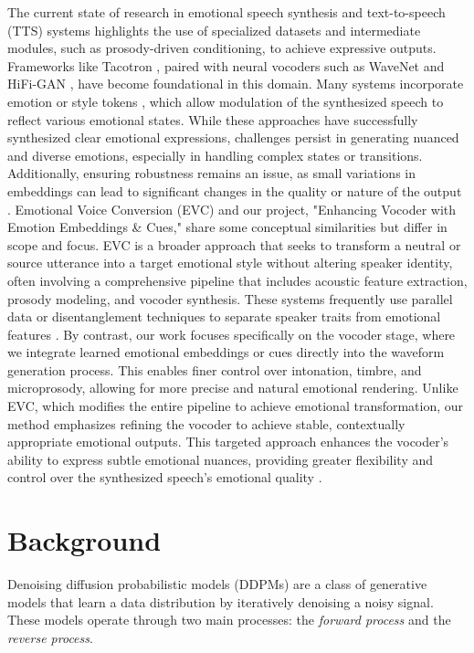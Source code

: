 \documentclass[12pt,a4paper]{article}
\begin{document}
The current state of research in emotional speech synthesis and text-to-speech
(TTS) systems highlights the use of specialized datasets and intermediate
modules, such as prosody-driven conditioning, to achieve expressive outputs.
Frameworks like Tacotron \cite{wang2017tacotron}, paired with neural vocoders
such as WaveNet \cite{oord2016wavenet} and HiFi-GAN \cite{kong2020hifi}, have
become foundational in this domain. Many systems incorporate emotion or style
tokens \cite{wang2018style}, which allow modulation of the synthesized speech to
reflect various emotional states. While these approaches have successfully
synthesized clear emotional expressions, challenges persist in generating
nuanced and diverse emotions, especially in handling complex states or
transitions. Additionally, ensuring robustness remains an issue, as small
variations in embeddings can lead to significant changes in the quality or
nature of the output \cite{zhang2021deep}. Emotional Voice Conversion (EVC) and
our project, "Enhancing Vocoder with Emotion Embeddings \& Cues," share some
conceptual similarities but differ in scope and focus. EVC is a broader approach
that seeks to transform a neutral or source utterance into a target emotional
style without altering speaker identity, often involving a comprehensive
pipeline that includes acoustic feature extraction, prosody modeling, and
vocoder synthesis. These systems frequently use parallel data or disentanglement
techniques to separate speaker traits from emotional features
\cite{zhou2020transforming}. By contrast, our work focuses specifically on the
vocoder stage, where we integrate learned emotional embeddings or cues directly
into the waveform generation process. This enables finer control over
intonation, timbre, and microprosody, allowing for more precise and natural
emotional rendering. Unlike EVC, which modifies the entire pipeline to achieve
emotional transformation, our method emphasizes refining the vocoder to achieve
stable, contextually appropriate emotional outputs. This targeted approach
enhances the vocoder’s ability to express subtle emotional nuances, providing
greater flexibility and control over the synthesized speech’s emotional quality
\cite{kim2021conditional}.

\newpage
\section{Background}

Denoising diffusion probabilistic models (DDPMs) are a class of generative
models that learn a data distribution by iteratively denoising a noisy signal.
These models operate through two main processes: the \textit{forward process}
and the \textit{reverse process}.
\end{document}
